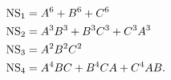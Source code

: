 \begin{equation} \label{1^6-orbits}
  \begin{split}
{\rm NS}_1 &= A^6 + B^6 +C^6 \\
{\rm NS}_2 &= A^3 B^3 + B^3 C^3 + C^3 A^3 \\
{\rm NS}_3 &= A^2 B^2 C^2 \\
{\rm NS}_4 &= A^4 B C + B^4 CA + C^4 A B .    
  \end{split}
\end{equation}

